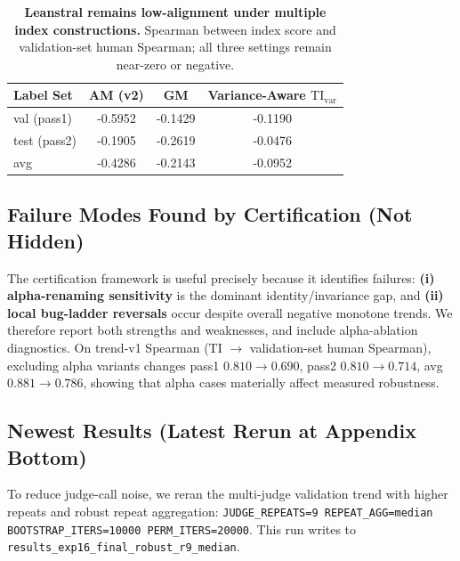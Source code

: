 \documentclass{article}
\begin{document}
\begin{table}[t]
  \centering
  \small
  \begin{tabular}{lccc}
    \toprule
    \textbf{Label Set} & \textbf{AM (v2)} & \textbf{GM} & \textbf{Variance-Aware \(\mathrm{TI}_{\mathrm{var}}\)} \\
    \midrule
    val (pass1)        & -0.5952          & -0.1429     & -0.1190                                                \\
    test (pass2)       & -0.1905          & -0.2619     & -0.0476                                                \\
    avg                & -0.4286          & -0.2143     & -0.0952                                                \\
    \bottomrule
  \end{tabular}
  \caption{\textbf{Leanstral remains low-alignment under multiple index constructions.}
    Spearman between index score and validation-set human Spearman; all three settings remain near-zero or negative.}
  \label{tab:app-leanstral-index-reagg}
\end{table}

\subsection{Failure Modes Found by Certification (Not Hidden)}
The certification framework is useful precisely because it identifies failures:
\textbf{(i) alpha-renaming sensitivity} is the dominant identity/invariance gap,
and \textbf{(ii) local bug-ladder reversals} occur despite overall negative monotone trends.
We therefore report both strengths and weaknesses, and include alpha-ablation diagnostics.
On trend-v1 Spearman (TI \(\rightarrow\) validation-set human Spearman), excluding alpha variants changes
pass1 \(0.810\rightarrow0.690\), pass2 \(0.810\rightarrow0.714\), avg \(0.881\rightarrow0.786\),
showing that alpha cases materially affect measured robustness.

\subsection{Newest Results (Latest Rerun at Appendix Bottom)}
To reduce judge-call noise, we reran the multi-judge validation trend with higher repeats and robust repeat aggregation:
\texttt{JUDGE\_REPEATS=9 REPEAT\_AGG=median BOOTSTRAP\_ITERS=10000 PERM\_ITERS=20000}.
This run writes to \texttt{results\_exp16\_final\_robust\_r9\_median}.
\end{document}
